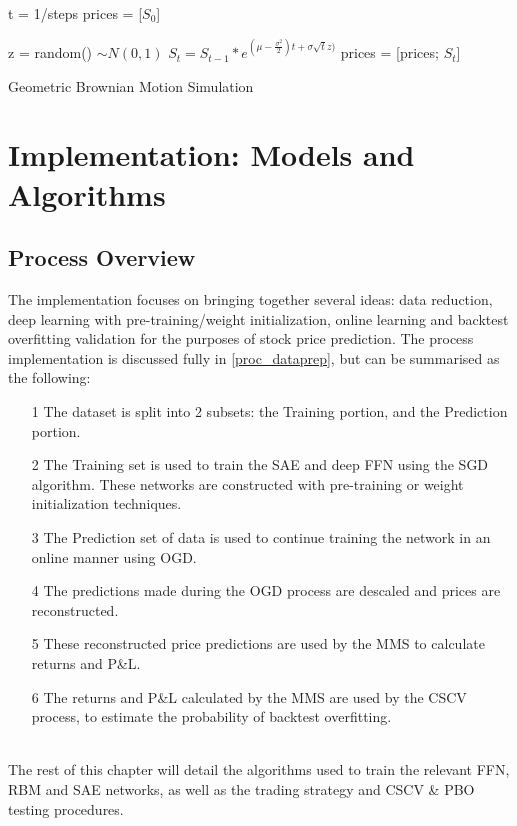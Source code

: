 \documentclass[a4paper,11pt,oneside]{article}
\theoremstyle{plain}
\theoremstyle{definition}
\begin{document}
\begin{algorithm}[H]

	t = 1/steps\;
	prices = [$S_0$]\;

	{
		z = random()  $\sim N(0,1)$\;
		$S_t = S_{t-1}*e^{(\mu - \frac {\sigma^2}{2})t + \sigma  \sqrt{t}  z)}$\;
		prices = [prices; $S_t$]\;
	}
	\label{algo_brownianmotion}
	\caption{Geometric Brownian Motion Simulation}
\end{algorithm}




\newpage
\section{Implementation: Models and Algorithms}\label{Implementation}
\subsection{Process Overview}\label{ProcessOverview}\label{imp_overview}


The implementation focuses on bringing together several ideas: data reduction, deep learning with pre-training/weight initialization, online learning and backtest overfitting validation for the purposes of stock price prediction. The process implementation is discussed fully in \ref{proc_dataprep}, but can be summarised as the following:

\begin{itemize}
	\item [1] The dataset is split into 2 subsets: the Training portion, and the Prediction portion.
	\item [2] The Training set is used to train the SAE and deep FFN using the SGD algorithm. These networks are constructed with pre-training or weight initialization techniques.
	\item [3] The Prediction set of data is used to continue training the network in an online manner using OGD.
	\item [4] The predictions made during the OGD process are descaled and prices are reconstructed.
	\item [5] These reconstructed price predictions are used by the MMS to calculate returns and P\&L.
	\item [6] The returns and P\&L calculated by the MMS are used by the CSCV process, to estimate the probability of backtest overfitting.
\end{itemize}
~\\
The rest of this chapter will detail the algorithms used to train the relevant FFN, RBM and SAE networks, as well as the trading strategy and CSCV \& PBO testing procedures.
\end{document}
